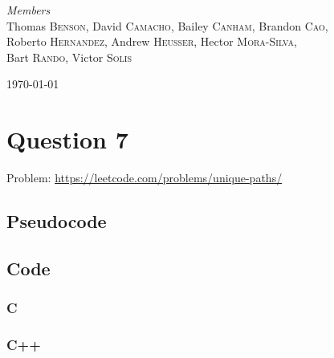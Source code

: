\documentclass[11pt]{article}
\begin{document}
\begin{titlepage}
	{\large\textit{Members}}\\
	Thomas \textsc{Benson},
	David \textsc{Camacho},
	Bailey \textsc{Canham},
	Brandon \textsc{Cao},\\
	Roberto \textsc{Hernandez},
	Andrew \textsc{Heusser},
    Hector \textsc{Mora-Silva},\\
	Bart \textsc{Rando},
	Victor \textsc{Solis}

	\vfill\vfill\vfill 
	{\large\today} 

	\vfill 

\end{titlepage}


\tableofcontents
\newpage


\section{Question 7}
Problem: \url{https://leetcode.com/problems/unique-paths/}

\subsection{Pseudocode}

\subsection{Code}
\subsubsection{C}
\subsubsection{C++}
\end{document}
